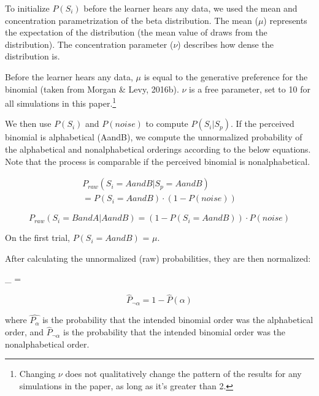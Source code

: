 \documentclass[10pt, letterpaper]{article}
\begin{document}
To initialize \(P(S_i)\) before the learner hears any data, we used the
mean and concentration parametrization of the beta distribution. The
mean (\(\mu\)) represents the expectation of the distribution (the mean
value of draws from the distribution). The concentration parameter
(\(\nu\)) describes how dense the distribution is.

Before the learner hears any data, \(\mu\) is equal to the generative
preference for the binomial (taken from Morgan \& Levy, 2016b). \(\nu\)
is a free parameter, set to 10 for all simulations in this
paper.\footnote{Changing \(\nu\) does not qualitatively change the
  pattern of the results for any simulations in the paper, as long as
  it's greater than 2.}

We then use \(P(S_i)\) and \(P(noise)\) to compute \(P(S_i|S_p)\). If
the perceived binomial is alphabetical (AandB), we compute the
unnormalized probability of the alphabetical and nonalphabetical
orderings according to the below equations. Note that the process is
comparable if the perceived binomial is nonalphabetical.

\begin{multline}
\label{eq:praw}
P_{raw}(S_i = AandB|S_p = AandB) \\ = P(S_i = AandB) \cdot (1 -  P(noise))
\end{multline}

\begin{equation}
\label{eqprawtwo}
P_{raw}(S_i = BandA|AandB) = (1 - P(S_i = AandB)) \cdot P(noise)
\end{equation}

On the first trial, \(P(S_i = AandB)\) = \(\mu\).

After calculating the unnormalized (raw) probabilities, they are then
normalized:

\begin{myequation}%
\label{eq:phatalpha}
_{\alpha} =  %
\end{myequation}

\begin{equation}
\label{eq:phatnotalpha}
\hat{P}_{\neg\alpha} = 1 - \hat{P}(\alpha)
\end{equation}

\noindent where \(\hat{P_\alpha}\) is the probability that the intended
binomial order was the alphabetical order, and \(\hat{P}_{\neg\alpha}\)
is the probability that the intended binomial order was the
nonalphabetical order.
\end{document}
